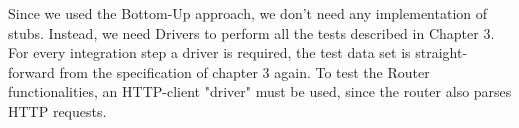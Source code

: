 Since we used the Bottom-Up approach, we don't need any implementation of stubs. Instead, we need Drivers to perform all the tests described in Chapter 3. For every integration step a driver is required, the test data set is straight-forward from the specification of chapter 3 again. 
To test the Router functionalities, an HTTP-client "driver" must be used, since the router also parses HTTP requests.

